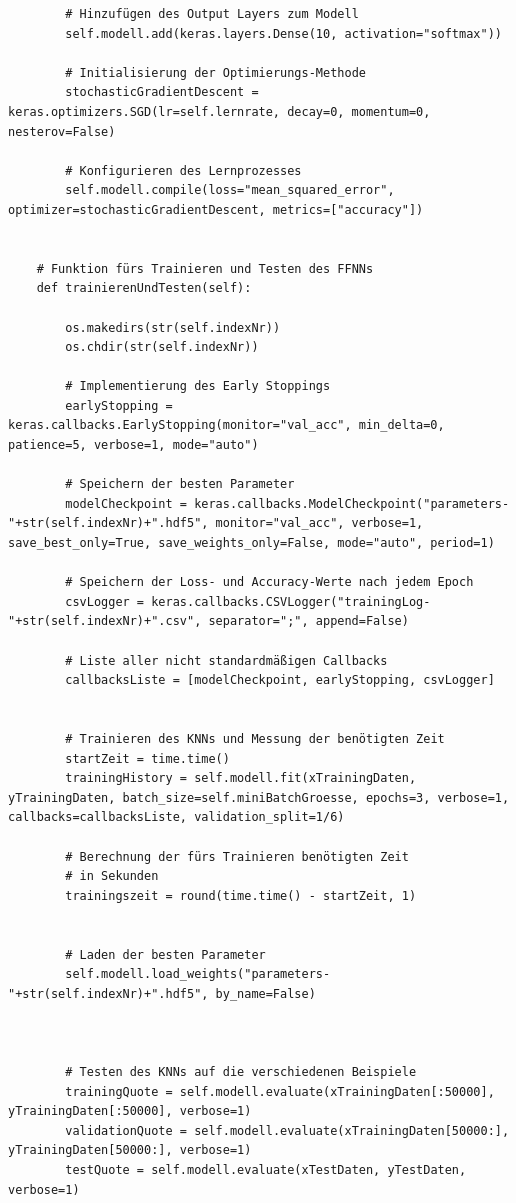 \documentclass[a4paper,12pt,ngerman,oneside]{scrreprt}	%
\begin{document}
{\begin{lstlisting}
		# Hinzufügen des Output Layers zum Modell
		self.modell.add(keras.layers.Dense(10, activation="softmax"))
		
		# Initialisierung der Optimierungs-Methode
		stochasticGradientDescent = keras.optimizers.SGD(lr=self.lernrate, decay=0, momentum=0, nesterov=False)
		
		# Konfigurieren des Lernprozesses
		self.modell.compile(loss="mean_squared_error", optimizer=stochasticGradientDescent, metrics=["accuracy"])
	
	
	# Funktion fürs Trainieren und Testen des FFNNs
	def trainierenUndTesten(self):
	
		os.makedirs(str(self.indexNr))
		os.chdir(str(self.indexNr))
		
		# Implementierung des Early Stoppings
		earlyStopping = keras.callbacks.EarlyStopping(monitor="val_acc", min_delta=0, patience=5, verbose=1, mode="auto")
		
		# Speichern der besten Parameter
		modelCheckpoint = keras.callbacks.ModelCheckpoint("parameters-"+str(self.indexNr)+".hdf5", monitor="val_acc", verbose=1, save_best_only=True, save_weights_only=False, mode="auto", period=1)
		
		# Speichern der Loss- und Accuracy-Werte nach jedem Epoch
		csvLogger = keras.callbacks.CSVLogger("trainingLog-"+str(self.indexNr)+".csv", separator=";", append=False)
		
		# Liste aller nicht standardmäßigen Callbacks
		callbacksListe = [modelCheckpoint, earlyStopping, csvLogger]
		
		
		# Trainieren des KNNs und Messung der benötigten Zeit
		startZeit = time.time()
		trainingHistory = self.modell.fit(xTrainingDaten, yTrainingDaten, batch_size=self.miniBatchGroesse, epochs=3, verbose=1, callbacks=callbacksListe, validation_split=1/6)
		
		# Berechnung der fürs Trainieren benötigten Zeit
		# in Sekunden
		trainingszeit = round(time.time() - startZeit, 1)
		
		
		# Laden der besten Parameter
		self.modell.load_weights("parameters-"+str(self.indexNr)+".hdf5", by_name=False)
		
		
		
		# Testen des KNNs auf die verschiedenen Beispiele
		trainingQuote = self.modell.evaluate(xTrainingDaten[:50000], yTrainingDaten[:50000], verbose=1)
		validationQuote = self.modell.evaluate(xTrainingDaten[50000:], yTrainingDaten[50000:], verbose=1)
		testQuote = self.modell.evaluate(xTestDaten, yTestDaten, verbose=1)
		

\end{lstlisting}}
\end{document}
